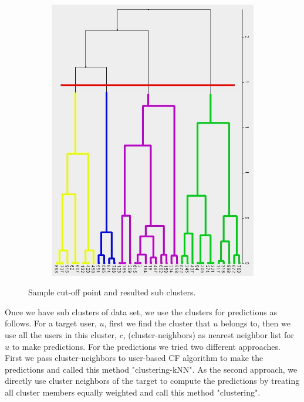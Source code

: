 \documentclass[conference]{IEEEtran}
\begin{document}
\begin{figure}[!h]
        \centering
        \begin{subfigure}[b]{0.45\textwidth}
                \includegraphics[width=\textwidth]{charts/cluster-cut-off.jpg}
        \end{subfigure}
        \caption{Sample cut-off point and resulted sub clusters.}
        \label{fig:cluster-cut-off}
\end{figure}

Once we have sub clusters of data set, we use the clusters for predictions as
follows. For a target user, $u$, first we find the cluster that $u$ belongs to,
then we use all the users in this cluster, $c$, (cluster-neighbors) as nearest 
neighbor list for $u$ to make predictions. For the predictions we tried two 
different approaches. First we pass cluster-neighbors to user-based CF 
algorithm to make the predictions and called this method "clustering-kNN". As the
second approach, we directly use cluster neighbors of the target to compute the
predictions by treating all cluster members equally weighted and call this 
method "clustering".
\end{document}
